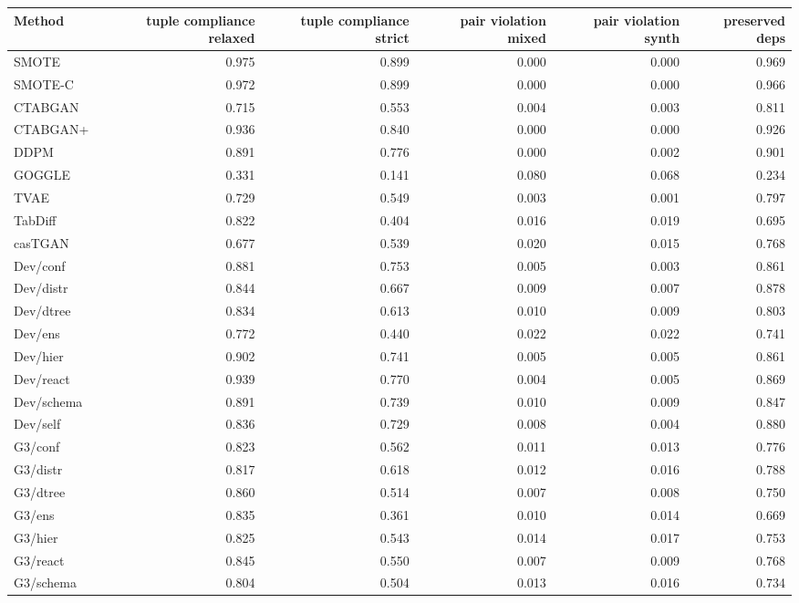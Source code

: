 \begin{table}[t]
\centering
\scriptsize
\setlength\tabcolsep{3pt}
\begin{tabular}{lrrrrr}
\toprule
\textbf{Method} & \textbf{tuple compliance relaxed} & \textbf{tuple compliance strict} & \textbf{pair violation mixed} & \textbf{pair violation synth} & \textbf{preserved deps} \\
\midrule
SMOTE & 0.975 & 0.899 & 0.000 & 0.000 & 0.969 \\
SMOTE-C & 0.972 & 0.899 & 0.000 & 0.000 & 0.966 \\
\midrule
CTABGAN & 0.715 & 0.553 & 0.004 & 0.003 & 0.811 \\
CTABGAN+ & 0.936 & 0.840 & 0.000 & 0.000 & 0.926 \\
DDPM & 0.891 & 0.776 & 0.000 & 0.002 & 0.901 \\
GOGGLE & 0.331 & 0.141 & 0.080 & 0.068 & 0.234 \\
TVAE & 0.729 & 0.549 & 0.003 & 0.001 & 0.797 \\
TabDiff & 0.822 & 0.404 & 0.016 & 0.019 & 0.695 \\
casTGAN & 0.677 & 0.539 & 0.020 & 0.015 & 0.768 \\
\midrule
Dev/conf & 0.881 & 0.753 & 0.005 & 0.003 & 0.861 \\
Dev/distr & 0.844 & 0.667 & 0.009 & 0.007 & 0.878 \\
Dev/dtree & 0.834 & 0.613 & 0.010 & 0.009 & 0.803 \\
Dev/ens & 0.772 & 0.440 & 0.022 & 0.022 & 0.741 \\
Dev/hier & 0.902 & 0.741 & 0.005 & 0.005 & 0.861 \\
Dev/react & 0.939 & 0.770 & 0.004 & 0.005 & 0.869 \\
Dev/schema & 0.891 & 0.739 & 0.010 & 0.009 & 0.847 \\
Dev/self & 0.836 & 0.729 & 0.008 & 0.004 & 0.880 \\
G3/conf & 0.823 & 0.562 & 0.011 & 0.013 & 0.776 \\
G3/distr & 0.817 & 0.618 & 0.012 & 0.016 & 0.788 \\
G3/dtree & 0.860 & 0.514 & 0.007 & 0.008 & 0.750 \\
G3/ens & 0.835 & 0.361 & 0.010 & 0.014 & 0.669 \\
G3/hier & 0.825 & 0.543 & 0.014 & 0.017 & 0.753 \\
G3/react & 0.845 & 0.550 & 0.007 & 0.009 & 0.768 \\
G3/schema & 0.804 & 0.504 & 0.013 & 0.016 & 0.734 \\

\end{tabular}
\end{table}
